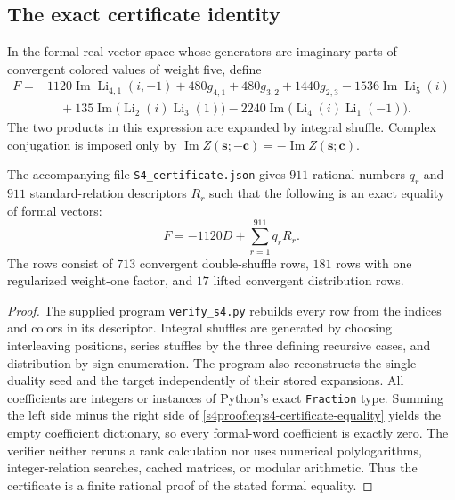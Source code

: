 \subsection{The exact certificate identity}
In the formal real vector space whose generators are imaginary parts of
convergent colored values of weight five, define
\begin{align}
 F={}&1120\operatorname{Im}\operatorname{Li}_{4,1}(i,-1)
       +480g_{4,1}+480g_{3,2}+1440g_{2,3}
       -1536\operatorname{Im}\operatorname{Li}_5(i)\nonumber\\
 &\quad+135\operatorname{Im}\bigl(\operatorname{Li}_2(i)
                                      \operatorname{Li}_3(1)\bigr)
       -2240\operatorname{Im}\bigl(\operatorname{Li}_4(i)
                                      \operatorname{Li}_1(-1)\bigr).
 \label{s4proof:eq:s4-certificate-target}
\end{align}
The two products in this expression are expanded by integral shuffle.
Complex conjugation is imposed only by
$\operatorname{Im}Z(\boldsymbol s;-\boldsymbol c)
=-\operatorname{Im}Z(\boldsymbol s;\boldsymbol c)$.

\begin{lemma}\label{s4proof:lem:s4-certificate}
The accompanying file \texttt{S4\_certificate.json} gives $911$ rational
numbers $q_r$ and $911$ standard-relation descriptors $R_r$ such that the
following is an exact equality of formal vectors:
\begin{equation}\label{s4proof:eq:s4-certificate-equality}
 F=-1120D+\sum_{r=1}^{911}q_rR_r.
\end{equation}
The rows consist of $713$ convergent double-shuffle rows, $181$ rows with
one regularized weight-one factor, and $17$ lifted convergent distribution
rows.
\end{lemma}
\begin{proof}
The supplied program \texttt{verify\_s4.py} rebuilds every row from the
indices and colors in its descriptor. Integral shuffles are generated by
choosing interleaving positions, series stuffles by the three defining
recursive cases, and distribution by sign enumeration. The program also
reconstructs the single duality seed and the target independently of their
stored expansions. All coefficients are integers or instances of Python's
exact \texttt{Fraction} type. Summing the left side minus the right side of
\eqref{s4proof:eq:s4-certificate-equality} yields the empty coefficient dictionary,
so every formal-word coefficient is exactly zero. The verifier neither
reruns a rank calculation nor uses numerical polylogarithms, integer-relation
searches, cached matrices, or modular arithmetic. Thus the certificate is
a finite rational proof of the stated formal equality.
\end{proof}

